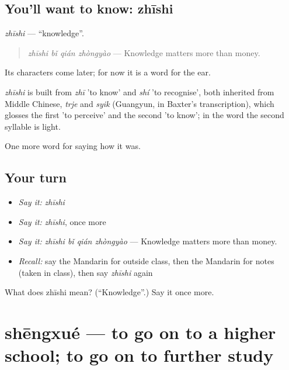 \subsection*{You'll want to know: zhīshi}
\emph{zhīshi} — \textquotedblleft{}knowledge\textquotedblright{}.

\begin{quote}
\emph{zhīshi bǐ qián zhòngyào} — Knowledge matters more than money.
\end{quote}

Its characters come later; for now it is a word for the ear.

\begin{cousinweb}
\emph{zhīshi} is built from \emph{zhī} 'to know' and \emph{shí} 'to recognise', both inherited from Middle Chinese, \emph{trje} and \emph{syik} (Guangyun, in Baxter's transcription), which glosses the first 'to perceive' and the second 'to know'; in the word the second syllable is light.
\end{cousinweb}

\begin{grammarlens}[title={What you've built}]
One more word for saying how it was.
\end{grammarlens}

\subsection*{Your turn}
\begin{itemize}
\raggedright
  \item \emph{Say it:} \emph{zhīshi}
  \item \emph{Say it:} \emph{zhīshi}, once more
  \item \emph{Say it:} \emph{zhīshi bǐ qián zhòngyào} — Knowledge matters more than money.
  \item \emph{Recall:} say the Mandarin for outside class, then the Mandarin for notes (taken in class), then say \emph{zhīshi} again
\end{itemize}

\begin{tcolorbox}[breakable,colback=teal!4,colframe=teal!35!black,title={Before you move on}]
What does zhīshi mean? (\textquotedblleft{}Knowledge\textquotedblright{}.) Say it once more.
\end{tcolorbox}
\section[shēngxué]{shēngxué — to go on to a higher school; to go on to further study}

